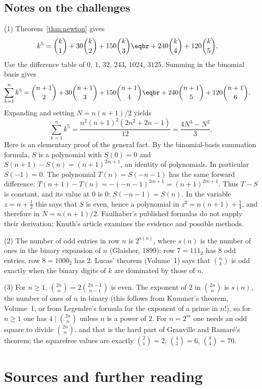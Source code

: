 \subsection*{Notes on the challenges}

(1) Theorem~\ref{thm:newton} gives
\[
\begin{aligned}
k^5&=\binom k1+30\binom k2+150\binom k3\eqbr+240\binom k4+120\binom k5.
\end{aligned}
\]
Use the difference table of $0$, $1$, $32$, $243$, $1024$, $3125$. Summing in the binomial basis gives
\[
\begin{aligned}
\sum_{k=1}^n k^5&=\binom{n+1}2+30\binom{n+1}3+150\binom{n+1}4\eqbr+240\binom{n+1}5+120\binom{n+1}6.
\end{aligned}
\]
Expanding and setting $N=n(n+1)/2$ yields
\[
\sum_{k=1}^n k^5=\frac{n^2(n+1)^2(2n^2+2n-1)}{12}=\frac{4N^3-N^2}3.
\]
Here is an elementary proof of the general fact. By the binomial-basis summation formula, $S$ is a polynomial with $S(0)=0$ and
$S(n+1)-S(n)=(n+1)^{2m+1}$, an identity of polynomials. In particular $S(-1)=0$.
The polynomial $T(n)=S(-n-1)$ has the same forward difference:
$T(n+1)-T(n)=-(-n-1)^{2m+1}=(n+1)^{2m+1}$.
Thus $T-S$ is constant, and its value at $0$ is $0$: $S(-n-1)=S(n)$.
In the variable $z=n+\frac12$ this says that $S$ is even, hence a polynomial in
$z^2=n(n+1)+\frac14$, and therefore in $N=n(n+1)/2$.
Faulhaber's published formulas do not supply their derivation; Knuth's article examines the evidence and possible methods.

(2) The number of odd entries in row $n$ is $2^{s(n)}$, where $s(n)$ is the number of ones in the binary expansion of $n$ (Glaisher, 1899): row $7=111_2$ has $8$ odd entries, row $8=1000_2$ has $2$. Lucas' theorem (Volume~1) says that $\binom nk$ is odd exactly when the binary digits of $k$ are dominated by those of $n$.

(3) For $n\ge1$, $\binom{2n}n=2\binom{2n-1}{n-1}$ is even. The exponent of $2$ in $\binom{2n}n$ is $s(n)$, the number of ones of $n$ in binary (this follows from Kummer's theorem, Volume~1, or from Legendre's formula for the exponent of a prime in $n!$), so for $n\ge1$ one has $4\mid\binom{2n}n$ unless $n$ is a power of $2$. For $n=2^m$ one needs an odd square to divide $\binom{2n}n$, and that is the hard part of Granville and Ramar\'e's theorem; the squarefree values are exactly $\binom21=2$, $\binom42=6$, $\binom84=70$.

\section*{Sources and further reading}

